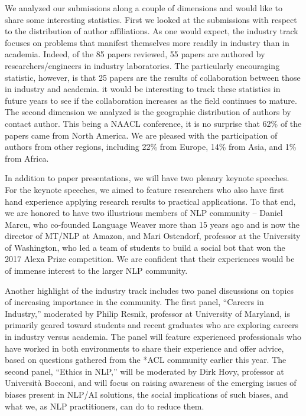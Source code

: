 We analyzed our submissions along a couple of dimensions and would like to share some interesting statistics. First we looked at the submissions with respect to the distribution of author affiliations. As one would expect, the industry track focuses on problems that manifest themselves more readily in industry than in academia. Indeed, of the 85 papers reviewed, 55 papers are authored by researchers/engineers in industry laboratories. The particularly encouraging statistic, however, is that 25 papers are the results of collaboration between those in industry and academia. it would be interesting to track these statistics in future years to see if the collaboration increases as the field continues to mature. The second dimension we analyzed is the geographic distribution of authors by contact author. This being a NAACL conference, it is no surprise that 62\% of the papers came from North America. We are pleased with the participation of authors from other regions, including 22\% from Europe, 14\% from Asia, and 1\% from Africa. 

In addition to paper presentations, we will have two plenary keynote speeches. For the keynote speeches, we aimed to feature researchers who also have first hand experience applying research results to practical applications. To that end, we are honored to have two illustrious members of NLP community --  Daniel Marcu, who co-founded Language Weaver more than 15 years ago and is now the director of MT/NLP at Amazon, and Mari Ostendorf, professor at the University of Washington, who led a team of students to build a social bot that won the 2017 Alexa Prize competition. We are confident that their experiences would be of immense interest to the larger NLP community.

Another highlight of the industry track includes two panel discussions on topics of increasing importance in the community. The first panel, ``Careers in Industry,'' moderated by Philip Resnik, professor at University of Maryland, is primarily geared toward students and recent graduates who are exploring careers in industry versus academia. The panel will feature experienced professionals who have worked in both environments to share their experience and offer advice, based on questions gathered from the *ACL community earlier this year. The second panel, ``Ethics in NLP,'' will be moderated by Dirk Hovy, professor at Università Bocconi, and will focus on raising awareness of the emerging issues of biases present in NLP/AI solutions, the social implications of such biases, and what we, as NLP practitioners, can do to reduce them. 

